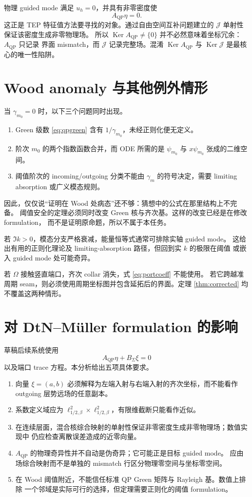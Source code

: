 \documentclass[UTF8,11pt,fontset=fandol]{ctexart}
\newcommand{\Om}{\Omega}
\newcommand{\Sig}{\Sigma}
\newcommand{\QP}{\mathrm{QP}}
\newcommand{\Ker}{\operatorname{Ker}}
\theoremstyle{plain}
\theoremstyle{definition}
\theoremstyle{remark}
\begin{document}
物理 guided mode 满足 \(u_h=0\)，并具有非零密度使
\[
A_{\QP}\eta=0.
\]
这正是 TEP 特征值方法要寻找的对象。通过自由空间互补问题建立的
\(\mathcal J\) 单射性保证该密度生成非零物理场。
所以 \(\Ker A_{\QP}\neq\{0\}\) 并不必然意味着坐标冗余：\(A_{\QP}\) 只记录
界面 mismatch，而 \(\mathcal J\) 记录完整场。混淆 \(\Ker A_{\QP}\) 与
\(\Ker\mathcal J\) 是最核心的唯一性陷阱。

\section{Wood anomaly 与其他例外情形}

当 \(\gamma_{m_0}=0\) 时，以下三个问题同时出现。

\begin{enumerate}
\item Green 级数 \eqref{eq:qpgreen} 含有 \(1/\gamma_{m_0}\)，未经正则化便无定义。
\item 阶次 \(m_0\) 的两个指数函数合并，而 ODE 所需的是
\(\psi_{m_0}\) 与 \(x\psi_{m_0}\) 张成的二维空间。
\item 阈值阶次的 incoming/outgoing 分类不能由 \(\gamma_m\) 的符号决定，需要
limiting absorption 或广义模态规则。
\end{enumerate}

因此，仅仅说“证明在 Wood 处病态”还不够：猜想中的公式在那里结构上不完备。
阈值安全的定理必须同时改变 Green 核与齐次基。这样的改变已经是在修改 formulation，
而不是证明原命题，所以不属于本任务。

若 \(\Im k>0\)，模态分支严格衰减，能量恒等式通常可排除实轴 guided mode。
这给出有用的正则化理论及 limiting-absorption 路径，但回到实 \(k\) 的极限在阈值
或嵌入 guided mode 处可能奇异。

若 \(\Om\) 接触竖直端口，齐次 collar 消失，式 \eqref{eq:portcoeff} 不能使用。
若它跨越准周期 seam，则必须使用周期坐标图并包含延拓后的界面。定理
\ref{thm:corrected} 均不覆盖这两种情形。

\section{对 DtN--Müller formulation 的影响}

草稿后续系统使用
\[
A_{\QP}\eta+B_\Sig\xi=0
\]
以及端口 trace 方程。本分析给出五项具体要求。

\begin{enumerate}
\item 向量 \(\xi=(a,b)\) 必须解释为左端入射与右端入射的齐次坐标，而不能看作
outgoing 层势远场的任意副本。
\item 系数定义域应为
\(\ell^2_{1/2,\beta}\times\ell^2_{1/2,\beta}\)，有限维截断只能看作近似。
\item 在连续层面，混合核综合映射的单射性保证非零密度生成非零物理场；数值实现中
仍应检查离散误差造成的近零向量。
\item \(A_{\QP}\) 的物理奇异性并不自动是伪奇异；它可能正是目标 guided mode。
应由场综合映射而不是单独的 mismatch 行区分物理零空间与坐标零空间。
\item 在 Wood 阈值附近，不能信任标准 QP Green 矩阵与 Rayleigh 基。数值上排除
一个邻域是实际可行的选择，但定理需要正则化的阈值 formulation。
\end{enumerate}
\end{document}
